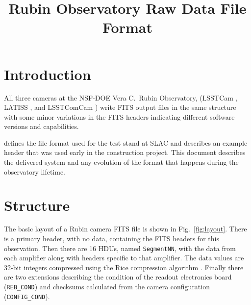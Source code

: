 \documentclass[OPS,lsstdraft,authoryear,toc]{lsstdoc}
\title{Rubin Observatory Raw Data File Format}
\date{\vcsDate}
\begin{document}
\maketitle


\section{Introduction}

All three cameras at the NSF-DOE Vera C.\ Rubin Observatory, (LSSTCam \citep{10.71929/rubin/2571927}, LATISS \citep{10.71929/rubin/2571930}, and LSSTComCam \citep{10.71929/rubin/2561361}) write FITS output files in the same structure with some minor variations in the FITS headers indicating different software versions and capabilities.

 defines the file format used for the test stand at SLAC and  describes an example header that was used early in the construction project.
This document describes the delivered system and any evolution of the format that happens during the observatory lifetime.

\section{Structure}

The basic layout of a Rubin camera FITS file is shown in Fig.~\ref{fig:layout}.
There is a primary header, with no data, containing the FITS headers for this observation.
Then there are 16 HDUs, named \texttt{SegmentNN}, with the data from each amplifier along with headers specific to that amplifier.
The data values are 32-bit integers compressed using the Rice compression algorithm \citep{2012arXiv1201.1336W}.
Finally there are two extensions describing the condition of the readout electronics board (\texttt{REB\_COND}) and checksums calculated from the camera configuration (\texttt{CONFIG\_COND}).
\end{document}
